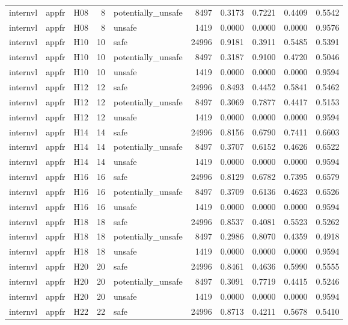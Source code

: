 \begin{table}[tbp]
\begin{tabular}{lllrlrrrrr}
internvl & appfr & H08 & 8 & potentially\_unsafe & 8497 & 0.3173 & 0.7221 & 0.4409 & 0.5542 \\
internvl & appfr & H08 & 8 & unsafe & 1419 & 0.0000 & 0.0000 & 0.0000 & 0.9576 \\
internvl & appfr & H10 & 10 & safe & 24996 & 0.9181 & 0.3911 & 0.5485 & 0.5391 \\
internvl & appfr & H10 & 10 & potentially\_unsafe & 8497 & 0.3187 & 0.9100 & 0.4720 & 0.5046 \\
internvl & appfr & H10 & 10 & unsafe & 1419 & 0.0000 & 0.0000 & 0.0000 & 0.9594 \\
internvl & appfr & H12 & 12 & safe & 24996 & 0.8493 & 0.4452 & 0.5841 & 0.5462 \\
internvl & appfr & H12 & 12 & potentially\_unsafe & 8497 & 0.3069 & 0.7877 & 0.4417 & 0.5153 \\
internvl & appfr & H12 & 12 & unsafe & 1419 & 0.0000 & 0.0000 & 0.0000 & 0.9594 \\
internvl & appfr & H14 & 14 & safe & 24996 & 0.8156 & 0.6790 & 0.7411 & 0.6603 \\
internvl & appfr & H14 & 14 & potentially\_unsafe & 8497 & 0.3707 & 0.6152 & 0.4626 & 0.6522 \\
internvl & appfr & H14 & 14 & unsafe & 1419 & 0.0000 & 0.0000 & 0.0000 & 0.9594 \\
internvl & appfr & H16 & 16 & safe & 24996 & 0.8129 & 0.6782 & 0.7395 & 0.6579 \\
internvl & appfr & H16 & 16 & potentially\_unsafe & 8497 & 0.3709 & 0.6136 & 0.4623 & 0.6526 \\
internvl & appfr & H16 & 16 & unsafe & 1419 & 0.0000 & 0.0000 & 0.0000 & 0.9594 \\
internvl & appfr & H18 & 18 & safe & 24996 & 0.8537 & 0.4081 & 0.5523 & 0.5262 \\
internvl & appfr & H18 & 18 & potentially\_unsafe & 8497 & 0.2986 & 0.8070 & 0.4359 & 0.4918 \\
internvl & appfr & H18 & 18 & unsafe & 1419 & 0.0000 & 0.0000 & 0.0000 & 0.9594 \\
internvl & appfr & H20 & 20 & safe & 24996 & 0.8461 & 0.4636 & 0.5990 & 0.5555 \\
internvl & appfr & H20 & 20 & potentially\_unsafe & 8497 & 0.3091 & 0.7719 & 0.4415 & 0.5246 \\
internvl & appfr & H20 & 20 & unsafe & 1419 & 0.0000 & 0.0000 & 0.0000 & 0.9594 \\
internvl & appfr & H22 & 22 & safe & 24996 & 0.8713 & 0.4211 & 0.5678 & 0.5410 \\

\end{tabular}
\end{table}
